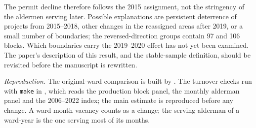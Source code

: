 The permit decline therefore follows the 2015 assignment, not the stringency of the aldermen serving later. Possible
explanations are persistent deterrence of projects from 2015--2018, other changes in the reassigned areas after
2019, or a small number of boundaries; the reversed-direction groups contain 97 and 106 blocks. Which boundaries
carry the 2019--2020 effect has not yet been examined. The paper's description of this result, and the stable-sample
definition, should be revisited before the manuscript is rewritten.

\textit{Reproduction.} The original-ward comparison is built by
. The turnover checks run with
\texttt{make} in , which reads the production block panel, the
monthly alderman panel and the 2006--2022 index; the main estimate is reproduced before any change. A ward-month
vacancy counts as a change; the serving alderman of a ward-year is the one serving most of its months.
